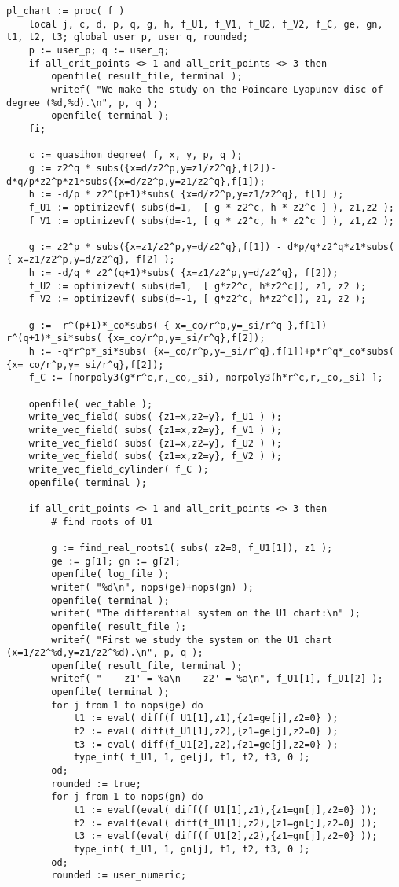 \documentclass[a4paper,10pt]{article}
\begin{document}
\begin{lstlisting}[name=infinity]
pl_chart := proc( f )
    local j, c, d, p, q, g, h, f_U1, f_V1, f_U2, f_V2, f_C, ge, gn, t1, t2, t3; global user_p, user_q, rounded;
    p := user_p; q := user_q;
    if all_crit_points <> 1 and all_crit_points <> 3 then
        openfile( result_file, terminal );
        writef( "We make the study on the Poincare-Lyapunov disc of degree (%d,%d).\n", p, q );
        openfile( terminal );
    fi;

    c := quasihom_degree( f, x, y, p, q );
    g := z2^q * subs({x=d/z2^p,y=z1/z2^q},f[2])-d*q/p*z2^p*z1*subs({x=d/z2^p,y=z1/z2^q},f[1]);
    h := -d/p * z2^(p+1)*subs( {x=d/z2^p,y=z1/z2^q}, f[1] );
    f_U1 := optimizevf( subs(d=1,  [ g * z2^c, h * z2^c ] ), z1,z2 );
    f_V1 := optimizevf( subs(d=-1, [ g * z2^c, h * z2^c ] ), z1,z2 );

    g := z2^p * subs({x=z1/z2^p,y=d/z2^q},f[1]) - d*p/q*z2^q*z1*subs( { x=z1/z2^p,y=d/z2^q}, f[2] );
    h := -d/q * z2^(q+1)*subs( {x=z1/z2^p,y=d/z2^q}, f[2]);
    f_U2 := optimizevf( subs(d=1,  [ g*z2^c, h*z2^c]), z1, z2 );
    f_V2 := optimizevf( subs(d=-1, [ g*z2^c, h*z2^c]), z1, z2 );

    g := -r^(p+1)*_co*subs( { x=_co/r^p,y=_si/r^q },f[1])-r^(q+1)*_si*subs( {x=_co/r^p,y=_si/r^q},f[2]);
    h := -q*r^p*_si*subs( {x=_co/r^p,y=_si/r^q},f[1])+p*r^q*_co*subs( {x=_co/r^p,y=_si/r^q},f[2]);
    f_C := [norpoly3(g*r^c,r,_co,_si), norpoly3(h*r^c,r,_co,_si) ];

    openfile( vec_table );
    write_vec_field( subs( {z1=x,z2=y}, f_U1 ) );
    write_vec_field( subs( {z1=x,z2=y}, f_V1 ) );
    write_vec_field( subs( {z1=x,z2=y}, f_U2 ) );
    write_vec_field( subs( {z1=x,z2=y}, f_V2 ) );
    write_vec_field_cylinder( f_C );
    openfile( terminal );

    if all_crit_points <> 1 and all_crit_points <> 3 then
        # find roots of U1

        g := find_real_roots1( subs( z2=0, f_U1[1]), z1 );
        ge := g[1]; gn := g[2];
        openfile( log_file );
        writef( "%d\n", nops(ge)+nops(gn) );
        openfile( terminal );
        writef( "The differential system on the U1 chart:\n" );
        openfile( result_file );
        writef( "First we study the system on the U1 chart (x=1/z2^%d,y=z1/z2^%d).\n", p, q );
        openfile( result_file, terminal );
        writef( "    z1' = %a\n    z2' = %a\n", f_U1[1], f_U1[2] );
        openfile( terminal );
        for j from 1 to nops(ge) do
            t1 := eval( diff(f_U1[1],z1),{z1=ge[j],z2=0} );
            t2 := eval( diff(f_U1[1],z2),{z1=ge[j],z2=0} );
            t3 := eval( diff(f_U1[2],z2),{z1=ge[j],z2=0} );
            type_inf( f_U1, 1, ge[j], t1, t2, t3, 0 );
        od;
        rounded := true;
        for j from 1 to nops(gn) do
            t1 := evalf(eval( diff(f_U1[1],z1),{z1=gn[j],z2=0} ));
            t2 := evalf(eval( diff(f_U1[1],z2),{z1=gn[j],z2=0} ));
            t3 := evalf(eval( diff(f_U1[2],z2),{z1=gn[j],z2=0} ));
            type_inf( f_U1, 1, gn[j], t1, t2, t3, 0 );
        od;
        rounded := user_numeric;


\end{lstlisting}
\end{document}
